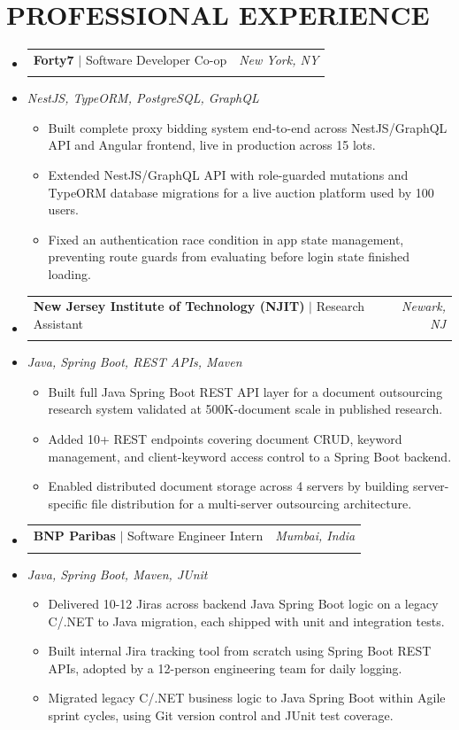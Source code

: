 \documentclass[letterpaper,11pt]{article}
\makeatletter
\newcommand{\resumeItem}[1]{
  \item\small{#1\vspace{-3pt}}
}
\newcommand{\resumeStack}[1]{
  \vspace{1pt}\item\small{\textit{#1}}\vspace{-6pt}
}
\newcommand{\resumeExpHeading}[4]{
  \vspace{-3pt}\item
    \begin{tabular*}{1.0\textwidth}[t]{l@{\extracolsep{\fill}}r}
      \textbf{\large #1} $|$ #2 & \textit{\large #3} \\
       & \text{\small #4} \\
    \end{tabular*}\vspace{-9pt}
}
\newcommand{\resumeItemListStart}{\begin{itemize}[leftmargin=0.15in, label=$\bullet$]}
\newcommand{\resumeItemListEnd}{\end{itemize}\vspace{-7pt}}
\newcommand{\resumeSubHeadingListStart}{\begin{itemize}[leftmargin=0.0in, label={}]}
\newcommand{\resumeSubHeadingListEnd}{\end{itemize}}
\makeatother
\begin{document}
\section{PROFESSIONAL EXPERIENCE}
\resumeSubHeadingListStart
\vspace{10pt}
\resumeExpHeading
{Forty7}{Software Developer Co-op}{New York, NY}{Jan 2026 -- May 2026}
\vspace{-13pt}
\resumeStack{NestJS, TypeORM, PostgreSQL, GraphQL}
\resumeItemListStart
  \resumeItem{Built complete proxy bidding system end-to-end across NestJS/GraphQL API and Angular frontend, live in production across 15 lots.}
  \resumeItem{Extended NestJS/GraphQL API with role-guarded mutations and TypeORM database migrations for a live auction platform used by 100 users.}
  \resumeItem{Fixed an authentication race condition in app state management, preventing route guards from evaluating before login state finished loading.}
\resumeItemListEnd
\vspace{10pt}
\resumeExpHeading
{New Jersey Institute of Technology (NJIT)}{Research Assistant}{Newark, NJ}{Apr 2025 -- Sep 2025}
\vspace{-13pt}
\resumeStack{Java, Spring Boot, REST APIs, Maven}
\resumeItemListStart
  \resumeItem{Built full Java Spring Boot REST API layer for a document outsourcing research system validated at 500K-document scale in published research.}
  \resumeItem{Added 10+ REST endpoints covering document CRUD, keyword management, and client-keyword access control to a Spring Boot backend.}
  \resumeItem{Enabled distributed document storage across 4 servers by building server-specific file distribution for a multi-server outsourcing architecture.}
\resumeItemListEnd
\vspace{10pt}
\resumeExpHeading
{BNP Paribas}{Software Engineer Intern}{Mumbai, India}{Jan 2024 -- Jul 2024}
\vspace{-13pt}
\resumeStack{Java, Spring Boot, Maven, JUnit}
\resumeItemListStart
  \resumeItem{Delivered 10-12 Jiras across backend Java Spring Boot logic on a legacy C/.NET to Java migration, each shipped with unit and integration tests.}
  \resumeItem{Built internal Jira tracking tool from scratch using Spring Boot REST APIs, adopted by a 12-person engineering team for daily logging.}
  \resumeItem{Migrated legacy C/.NET business logic to Java Spring Boot within Agile sprint cycles, using Git version control and JUnit test coverage.}
\resumeItemListEnd

\resumeSubHeadingListEnd

\vspace{-3pt}
\end{document}
